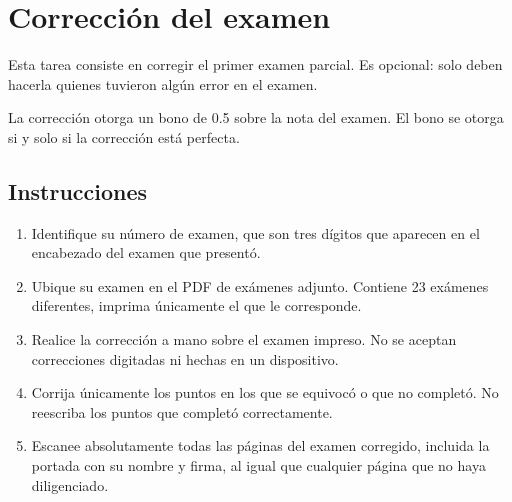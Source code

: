 \section{Corrección del examen}

Esta tarea consiste en corregir el primer examen parcial. Es opcional: solo deben hacerla quienes tuvieron algún error en el examen.

La corrección otorga un bono de 0.5 sobre la nota del examen. El bono se otorga si y solo si la corrección está perfecta.

\subsection{Instrucciones}

\begin{enumerate}
  \item Identifique su número de examen, que son tres dígitos que aparecen en el encabezado del examen que presentó.
  \item Ubique su examen en el PDF de exámenes adjunto. Contiene 23 exámenes diferentes, imprima únicamente el que le corresponde.
  \item Realice la corrección a mano sobre el examen impreso. No se aceptan correcciones digitadas ni hechas en un dispositivo.
  \item Corrija únicamente los puntos en los que se equivocó o que no completó. No reescriba los puntos que completó correctamente.
  \item Escanee absolutamente todas las páginas del examen corregido, incluida la portada con su nombre y firma, al igual que cualquier página que no haya diligenciado.
\end{enumerate}
